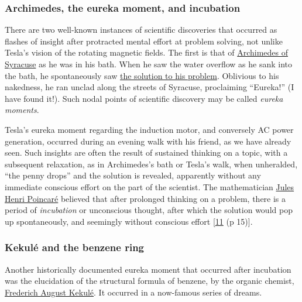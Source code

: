 \documentclass[
  a4paper,
]{article}
\begin{document}
\hypertarget{archimedes-the-eureka-moment-and-incubation}{%
\subsubsection{Archimedes, the eureka moment, and
incubation}\label{archimedes-the-eureka-moment-and-incubation}}

There are two well-known instances of scientific discoveries that
occurred as flashes of insight after protracted mental effort at problem
solving, not unlike Tesla's vision of the rotating magnetic fields. The
first is that of
\href{https://en.wikipedia.org/wiki/Archimedes}{Archimedes of Syracuse}
as he was in his bath. When he saw the water overflow as he sank into
the bath, he spontaneously saw
\href{https://en.wikipedia.org/wiki/Archimedes\#Archimedes\textquotesingle{}_principle}{the
solution to his problem}. Oblivious to his nakedness, he ran unclad
along the streets of Syracuse, proclaiming ``Eureka!'' (I have found
it!). Such nodal points of scientific discovery may be called
\emph{eureka moments}.

Tesla's eureka moment regarding the induction motor, and conversely AC
power generation, occurred during an evening walk with his friend, as we
have already seen. Such insights are often the result of sustained
thinking on a topic, with a subsequent relaxation, as in Archimedes's
bath or Tesla's walk, when unheralded, ``the penny drops'' and the
solution is revealed, apparently without any immediate conscious effort
on the part of the scientist. The mathematician
\href{https://en.wikipedia.org/wiki/Henri_Poincar\%C3\%A9}{Jules Henri
Poincaré} believed that after prolonged thinking on a problem, there is
a period of \emph{incubation} or unconscious thought, after which the
solution would pop up spontaneously, and seemingly without conscious
effort {[}\protect\hyperlink{ref-weisberg86}{11} (p 15){]}.

\hypertarget{kekuluxe9-and-the-benzene-ring}{%
\subsubsection{Kekulé and the benzene
ring}\label{kekuluxe9-and-the-benzene-ring}}

Another historically documented eureka moment that occurred after
incubation was the elucidation of the structural formula of benzene, by
the organic chemist,
\href{https://en.wikipedia.org/wiki/August_Kekul\%C3\%A9}{Frederich
August Kekulé}. It occurred in a now-famous series of dreams.
\end{document}
